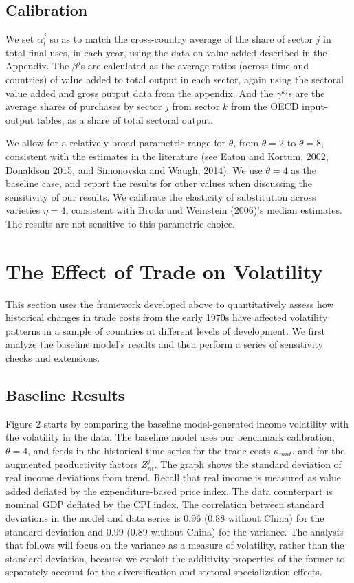 \documentclass[12pt]{article}
\begin{document}
\subsection{Calibration}

We set $\alpha _{t}^{j}$ so as to match the cross-country average of the
share of sector $j$ in total final uses, in each year, using the data on
value added described in the Appendix. The $\beta ^{j}$s are calculated as
the average ratios (across time and countries) of value added to total
output in each sector, again using the sectoral value added and gross output
data from the appendix. And the $\gamma ^{kj}$s are the average shares of
purchases by sector $j$ from sector $k$ from the OECD input-output tables,
as a share of total sectoral output.

We allow for a relatively broad parametric range for $\theta $, from $\theta
=2$ to $\theta =8,$ consistent with the estimates in the literature (see
Eaton and Kortum, 2002, Donaldson 2015, and Simonovska and Waugh, 2014). We
use $\theta =4$ as the baseline case, and report the results for other
values when discussing the sensitivity of our results. We calibrate the
elasticity of substitution across varieties $\eta =4$, consistent with Broda
and Weinstein (2006)'s median estimates. The results are not sensitive to
this parametric choice.

\section{The Effect of Trade on Volatility}

This section uses the framework developed above to quantitatively assess how
historical changes in trade costs from the early 1970s have affected
volatility patterns in a sample of countries at different levels of
development. We first analyze the baseline model's results and then perform
a series of sensitivity checks and extensions.

\subsection{Baseline Results}

Figure 2 starts by comparing the baseline model-generated income volatility
with the volatility in the data. The baseline model uses our benchmark
calibration, $\theta =4$, and feeds in the historical time series for the
trade costs $\kappa _{mnt}$, and for the augmented productivity factors $%
Z_{nt}^{j}$. The graph shows the standard deviation of real income
deviations from trend. Recall that real income is measured as value added
deflated by the expenditure-based price index. The data counterpart is
nominal GDP deflated by the CPI index. The correlation between standard
deviations in the model and data series is 0.96 (0.88 without China) for the
standard deviation and 0.99 (0.89 without China) for the variance. The
analysis that follows will focus on the variance as a measure of volatility,
rather than the standard deviation, because we exploit the additivity
properties of the former to separately account for the diversification and
sectoral-specialization effects.
\end{document}
